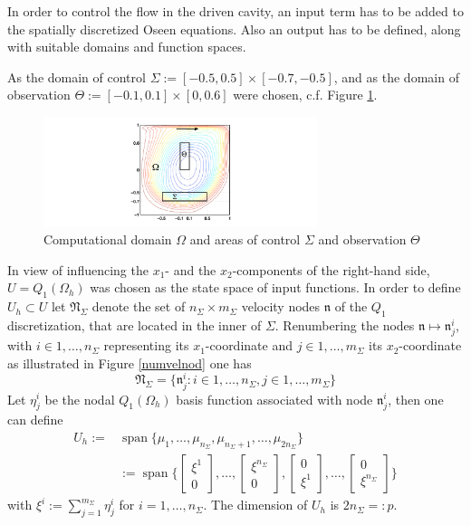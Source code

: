 \documentclass[a4paper,10pt,BCOR=15mm]{scrbook}
\DeclareMathOperator{\spann}{span}
\begin{document}
In order to control the flow in the driven cavity, an input term has to be added to the spatially discretized Oseen equations. Also an output has to be defined, along with suitable domains and function spaces.

As the domain of control $\Sigma := [-0.5,0.5] \times [-0.7,-0.5]  $, and as the domain of observation $\Theta := [-0.1,0.1] \times [0,0.6]$  were chosen, c.f. Figure \ref{pdco}.

\begin{figure}[htbp]
\begin{center}
 \includegraphics[width=8cm]{pics/domains.pdf}
 \caption{Computational domain $\Omega$ and areas of control $\Sigma$ and observation $\Theta$}
 \label{pdco}
\end{center}
\end{figure}

In view of influencing the $x_1$- and the $x_2$-components of the right-hand side, $U = Q_1(\Omega_h)$ was chosen as the state space of input functions. In order to define $U_h \subset U$ let $\mathfrak N_\Sigma$ denote the set of $n_\Sigma \times m_\Sigma$ velocity nodes $\mathfrak n$ of the $Q_1$ discretization, that are located in the inner of $\Sigma$. Renumbering the nodes $\mathfrak n \mapsto \mathfrak n_j^i$, with $i\in{1,\dotsc,n_\Sigma}$ representing its $x_1$-coordinate and $j\in{1,\dotsc,m_\Sigma}$ its $x_2$-coordinate as illustrated in Figure \ref{numvelnod} one has
\begin{equation*}
 \mathfrak N_\Sigma = \bigl \{ \mathfrak n_j^i: i\in{1,\dotsc,n_\Sigma},j\in{1,\dotsc,m_\Sigma} \bigr \}
\end{equation*}
Let $\eta_j^i$ be the nodal $Q_1(\Omega_h)$ basis function associated with node $\mathfrak n_j^i$, then one can define 
\begin{align*}
 U_h := &\spann \bigl \{ \mu_{1}, \dotsc ,\mu_{n_\Sigma}, \mu_{n_\Sigma +1}, \dotsc , \mu_{2n_\Sigma}  \bigr \}\\
&:=\spann \bigl \{ \begin{bmatrix} \xi^1 \\ 0 \end{bmatrix}, \dotsc , \begin{bmatrix} \xi^{n_\Sigma} \\ 0 \end{bmatrix},\begin{bmatrix} 0 \\ \xi^1 \end{bmatrix}, \dotsc , \begin{bmatrix} 0 \\ \xi^{n_\Sigma} \end{bmatrix} \bigr \}
\end{align*}
with $ \xi^i := \sum _{j=1}^{m_\Sigma}\eta_j^i $ for $i=1,\dotsc,n_\Sigma$. The dimension of $U_h$ is $2n_\Sigma =: p$.
\end{document}
